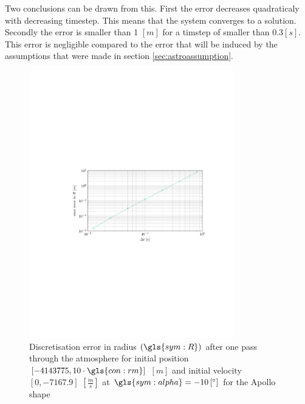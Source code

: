 Two conclusions can be drawn from this. First the error decreases quadraticaly with decreasing timestep. This means that the system converges to a solution. Secondly the error is smaller than 1 $\left[m\right]$ for a timstep of smaller than $0.3 \left[s\right]$. This error is negligible compared to the error that will be induced by the assumptions that were made in section \ref{sec:astroassumption}.



\begin{figure}[h]
	\centering
	\includegraphics[trim={4.25cm 10cm 3.2cm 10cm},clip,width=0.8\textwidth]{Figure/orbital_model/dicretization.pdf}
	\caption[Discretisation error in radius $\left(\gls{sym:R}\right)$ after one pass through the atmosphere for the Apollo shape]{Discretisation error in radius $\left(\gls{sym:R}\right)$ after one pass through the atmosphere for initial position $\left[-4143775,10\cdot\gls{con:rm}\right]$ $\left[m\right]$ and initial velocity $\left[0,-7167.9\right]$ $\left[\frac{m}{s}\right]$ at $\gls{sym:alpha}=-10\left[^\circ\right]$ for the Apollo shape}
	\label{fig:atmos_disc}
\end{figure}

